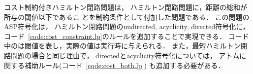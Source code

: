 

コスト制約付きハミルトン閉路問題は，
ハミルトン閉路問題に，距離の総和が所与の閾値以下であるこ
とを制約条件として付加した問題である．
この問題のASP符号化は，
ハミルトン閉路問題の\textsf{undirected}, \textsf{acyclicity},
\textsf{directed}符号化に，
コード~\ref{code:cost_constraint.lp}のルールを追加することで実現できる．
%
コード中のは閾値を表し，実際の値は実行時に与えられる．
また，最短ハミルトン閉路問題の場合と同じ理由で，
\textsf{directed}と\textsf{acyclicity}符号化については，
アトムに関する補助ルール(コード~\ref{code:cost_both.lp})
も追加する必要がある．

